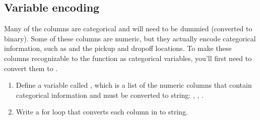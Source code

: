 \documentclass[letterpaper,10pt,english]{sphinxmanual}
\begin{document}
\subsection{Variable encoding}
\label{\detokenize{Automatidata_Machine Learning:variable-encoding}}
\sphinxAtStartPar
Many of the columns are categorical and will need to be dummied (converted to binary). Some of these columns are numeric, but they actually encode categorical information, such as  and the pickup and dropoff locations. To make these columns recognizable to the  function as categorical variables, you’ll first need to convert them to .
\begin{enumerate}
%
\item {} 
\sphinxAtStartPar
Define a variable called , which is a list of the numeric columns that contain categorical information and must be converted to string: , , .

\item {} 
\sphinxAtStartPar
Write a for loop that converts each column in  to string.

\end{enumerate}
\end{document}
